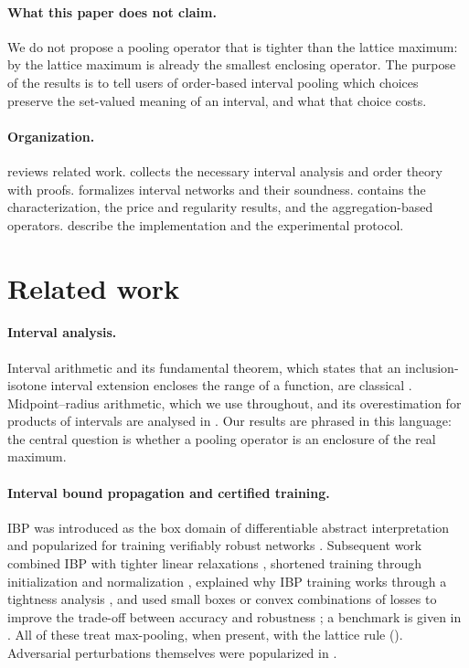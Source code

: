 \paragraph{What this paper does not claim.} We do not propose a pooling operator that is tighter than the lattice maximum: by  the lattice maximum is already the smallest enclosing operator. The purpose of the results is to tell users of order-based interval pooling which choices preserve the set-valued meaning of an interval, and what that choice costs.

\paragraph{Organization.}  reviews related work.  collects the necessary interval analysis and order theory with proofs.  formalizes interval networks and their soundness.  contains the characterization,  the price and regularity results, and  the aggregation-based operators.  describe the implementation and the experimental protocol.

\section{Related work}
\label{sec:related}

\paragraph{Interval analysis.} Interval arithmetic and its fundamental theorem, which states that an inclusion-isotone interval extension encloses the range of a function, are classical \cite{moore2009}. Midpoint--radius arithmetic, which we use throughout, and its overestimation for products of intervals are analysed in \cite{rump1999}. Our results are phrased in this language: the central question is whether a pooling operator is an enclosure of the real maximum.

\paragraph{Interval bound propagation and certified training.} IBP was introduced as the box domain of differentiable abstract interpretation \cite{mirman2018} and popularized for training verifiably robust networks \cite{gowal2018}. Subsequent work combined IBP with tighter linear relaxations \cite{zhang2020crownibp}, shortened training through initialization and normalization \cite{shi2021}, explained why IBP training works through a tightness analysis \cite{mao2024}, and used small boxes or convex combinations of losses to improve the trade-off between accuracy and robustness \cite{muller2023sabr,depalma2024}; a benchmark is given in \cite{mao2024ctbench}. All of these treat max-pooling, when present, with the lattice rule (). Adversarial perturbations themselves were popularized in \cite{goodfellow2015}.

